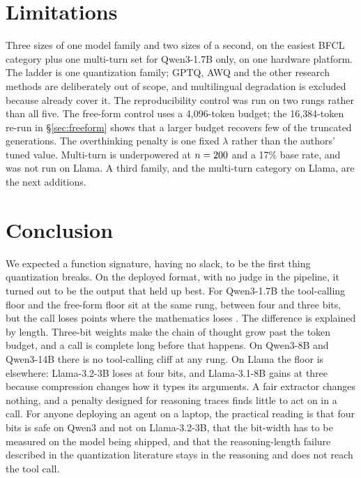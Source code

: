 \documentclass[10pt]{article}
\newcommand{\bfcl}{BFCL}
\newcommand{\qm}{Qwen3-1.7B}
\begin{document}
\section{Limitations}

Three sizes of one model family and two sizes of a second, on the easiest \bfcl{} category plus one multi-turn set for Qwen3-1.7B only, on one hardware platform. The ladder is one quantization family; GPTQ, AWQ and the other research methods are deliberately out of scope, and multilingual degradation is excluded because \citet{marchisio2024multilingual} already cover it. The reproducibility control was run on two rungs rather than all five. The free-form control uses a 4{,}096-token budget; the 16{,}384-token re-run in \S\ref{sec:freeform} shows that a larger budget recovers few of the \qtGsmTruncThree{} truncated generations. The overthinking penalty is one fixed $\lambda$ rather than the authors' tuned value. Multi-turn is underpowered at $n=200{}$ and a 17\% base rate, and was not run on Llama. A third family, and the multi-turn category on Llama, are the next additions.

\section{Conclusion}

We expected a function signature, having no slack, to be the first thing quantization breaks. On the deployed format, with no judge in the pipeline, it turned out to be the output that held up best. For \qm{} the tool-calling floor and the free-form floor sit at the same rung, between four and three bits, but the call loses \qtDropThree{} points where the mathematics loses \qtGsmDropThree{}. The difference is explained by length. Three-bit weights make the chain of thought grow past the token budget, and a call is complete long before that happens. On Qwen3-8B and Qwen3-14B there is no tool-calling cliff at any rung. On Llama the floor is elsewhere: Llama-3.2-3B loses at four bits, and Llama-3.1-8B gains at three because compression changes how it types its arguments. A fair extractor changes nothing, and a penalty designed for reasoning traces finds little to act on in a call. For anyone deploying an agent on a laptop, the practical reading is that four bits is safe on Qwen3 and not on Llama-3.2-3B, that the bit-width has to be measured on the model being shipped, and that the reasoning-length failure described in the quantization literature stays in the reasoning and does not reach the tool call.
\end{document}
